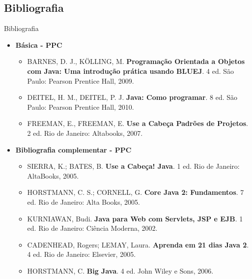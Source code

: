 \documentclass{beamer}
\begin{document}
\subsection{Bibliografia}

\begin{frame}{Bibliografia}
    \begin{itemize}
        \item \textbf{Básica - PPC}
        \begin{itemize}
            \justifying
            \scriptsize
            \item BARNES, D. J., KÖLLING, M. \textbf{Programação Orientada a Objetos com Java: Uma introdução prática usando BLUEJ}. 4 ed. São Paulo: Pearson Prentice Hall, 2009.
            \item DEITEL, H. M., DEITEL, P. J. \textbf{Java: Como programar}. 8 ed. São Paulo: Pearson Prentice Hall, 2010.
            \item FREEMAN, E., FREEMAN, E. \textbf{Use a Cabeça Padrões de Projetos}. 2 ed. Rio de Janeiro: Altabooks, 2007.
        \end{itemize}
        \normalsize
        \item \textbf{Bibliografia complementar - PPC}
        \begin{itemize}
            \justifying
            \scriptsize
            \item SIERRA, K.; BATES, B. \textbf{Use a Cabeça! Java}. 1 ed. Rio de Janeiro: AltaBooks, 2005.
            \item HORSTMANN, C. S.; CORNELL, G. \textbf{Core Java 2: Fundamentos}. 7 ed. Rio de Janeiro: Alta Books, 2005.
            \item KURNIAWAN, Budi. \textbf{Java para Web com Servlets, JSP e EJB}. 1 ed. Rio de Janeiro: Ciência Moderna, 2002.
            \item CADENHEAD, Rogers; LEMAY, Laura. \textbf{Aprenda em 21 dias Java 2}. 4 ed. Rio de Janeiro: Elsevier, 2005.
            \item HORSTMANN, C. \textbf{Big Java}. 4 ed. John Wiley e Sons, 2006.
        \end{itemize}
    \end{itemize}
\end{frame}
\end{document}
